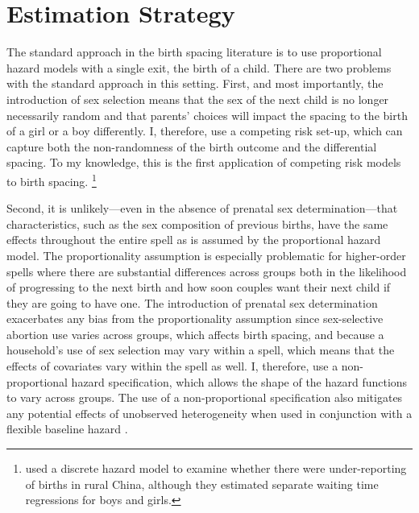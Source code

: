 \documentclass[12pt,letterpaper]{article}
\begin{document}
\section{Estimation Strategy\label{sec:strategy}}


The standard approach in the birth spacing literature is to use proportional hazard
models with a single exit, the birth of a child.
There are two problems with the standard approach in this setting.
First, and most importantly, the introduction of sex selection means that the sex of the 
next child is no longer necessarily random and that parents' choices will impact the 
spacing to the birth of a girl or a boy differently.
I, therefore, use a competing risk set-up, which can capture both the non-randomness of
the birth outcome and the differential spacing.
To my knowledge, this is the first application of competing risk models to birth
spacing.%
\footnote{
\cite{Merli2000} used a discrete hazard model to examine whether 
there were under-reporting of births in rural China, although they 
estimated separate waiting time regressions for boys and girls.
}

Second, it is unlikely---even in the absence of prenatal sex determination---that 
characteristics, such as the sex composition of previous births, have the same effects 
throughout the entire spell as is assumed by the proportional hazard model.
The proportionality assumption is especially problematic for higher-order spells where 
there are substantial differences across groups both in the likelihood of progressing to 
the next birth and how soon couples want their next child if they are going to have one.
The introduction of prenatal sex determination exacerbates any bias from the 
proportionality assumption since sex-selective abortion use varies across groups,
which affects birth spacing, and because a household's use of sex selection may vary 
within a spell, which means that the effects of covariates vary within the spell as well.
I, therefore, use a non-proportional hazard specification, which allows the shape of the 
hazard functions to vary across groups.
The use of a non-proportional specification also mitigates any potential effects 
of unobserved heterogeneity when used in conjunction with a flexible baseline hazard 
\citep{Dolton1995}.
\end{document}
